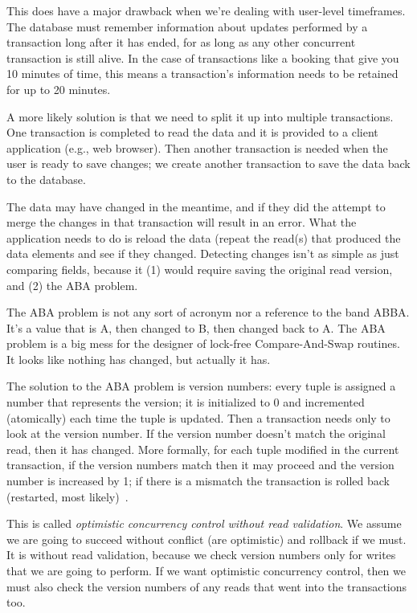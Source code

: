 \documentclass[a4paper]{report}
\begin{document}
This does have a major drawback when we're dealing with user-level timeframes. The database must remember information about updates performed by a transaction long after it has ended, for as long as any other concurrent transaction is still alive. In the case of transactions like a booking that give you 10 minutes of time, this means a transaction's information needs to be retained for up to 20 minutes. 

A more likely solution is that we need to split it up into multiple transactions. One transaction is completed to read the data and it is provided to a client application (e.g., web browser). Then another transaction is needed when the user is ready to save changes; we create another transaction to save the data back to the database. 

The data may have changed in the meantime, and if they did the attempt to merge the changes in that transaction will result in an error. What the application needs to do is reload the data (repeat the read(s) that produced the data elements and see if they changed. Detecting changes isn't as simple as just comparing fields, because it (1) would require saving the original read version, and (2) the ABA problem.

The ABA problem is not any sort of acronym nor a reference to the band ABBA. It's a value that is A, then changed to B, then changed back to A. The ABA problem is a big mess for the designer of lock-free Compare-And-Swap routines. It looks like nothing has changed, but actually it has. 

The solution to the ABA problem is version numbers: every tuple is assigned a number that represents the version; it is initialized to 0 and incremented (atomically) each time the tuple is updated. Then a transaction needs only to look at the version number. If the version number doesn't match the original read, then it has changed. More formally, for each tuple modified in the current transaction, if the version numbers match then it may proceed and the version number is increased by 1; if there is a mismatch the transaction is rolled back (restarted, most likely)~\cite{dsc}.

This is called \textit{optimistic concurrency control without read validation}. We assume we are going to succeed without conflict (are optimistic) and rollback if we must. It is without read validation, because we check version numbers only for writes that we are going to perform. If we want optimistic concurrency control, then we must also check the version numbers of any reads that went into the transactions too.
\end{document}
